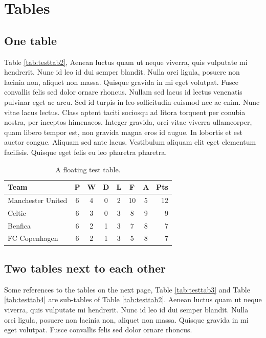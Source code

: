 \section{Tables}
\subsection{One table}
Table \ref{tab:testtab2}, Aenean luctus quam ut neque viverra, quis vulputate
mi hendrerit. Nunc id leo id dui semper blandit. Nulla orci ligula, posuere non
lacinia non, aliquet non massa. Quisque gravida in mi eget volutpat. Fusce
convallis felis sed dolor ornare rhoncus. Nullam sed lacus id lectus venenatis
pulvinar eget ac arcu. Sed id turpis in leo sollicitudin euismod nec ac enim.
Nunc vitae lacus lectus.  Class aptent taciti sociosqu ad litora torquent per
conubia nostra, per inceptos himenaeos. Integer gravida, orci vitae viverra
ullamcorper, quam libero tempor est, non gravida magna eros id augue. In
lobortis et est auctor congue. Aliquam sed ante lacus. Vestibulum aliquam elit
eget elementum facilisis. Quisque eget felis eu leo pharetra pharetra.

\begin{table}[!ht]
  \centering
  \begin{tabular}{l*{6}{c}r}
      Team              & P & W & D & L & F  & A & Pts \\
      \hline
      Manchester United & 6 & 4 & 0 & 2 & 10 & 5 & 12  \\
      Celtic            & 6 & 3 & 0 & 3 &  8 & 9 &  9  \\
      Benfica           & 6 & 2 & 1 & 3 &  7 & 8 &  7  \\
      FC Copenhagen     & 6 & 2 & 1 & 3 &  5 & 8 &  7  \\
  \end{tabular}
  \caption{A floating test table.}
  \label{tab:testtab1}
\end{table}

\subsection{Two tables next to each other}
Some references to the tables on the next page, Table \ref{tab:testtab3} and
Table \ref{tab:testtab4} are sub-tables of Table \ref{tab:testtab2}. Aenean
luctus quam ut neque viverra, quis vulputate mi hendrerit. Nunc id leo id dui
semper blandit. Nulla orci ligula, posuere non lacinia non, aliquet non massa.
Quisque gravida in mi eget volutpat. Fusce convallis felis sed dolor ornare
rhoncus.

